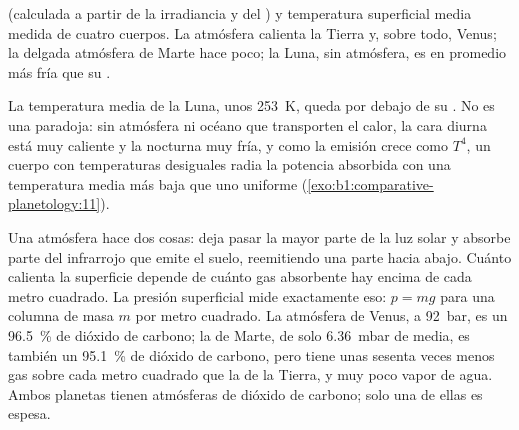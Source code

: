 \begin{omfigure}

{\small {} (calculada a partir de la irradiancia y del )
y temperatura superficial media medida de cuatro cuerpos. La atmósfera calienta la Tierra y,
sobre todo, Venus; la delgada atmósfera de Marte hace poco; la Luna, sin atmósfera, es en
promedio más fría que su .}
\end{omfigure}

La temperatura media de la Luna, unos \qty{253}{K}, queda por debajo de su . No es una paradoja: sin atmósfera ni océano que transporten el calor, la cara
diurna está muy caliente y la nocturna muy fría, y como la emisión crece como $T^4$, un cuerpo
con temperaturas desiguales radia la potencia absorbida con una temperatura media más baja que
uno uniforme (\cref{exo:b1:comparative-planetology:11}).

Una atmósfera hace dos cosas: deja pasar la mayor parte de la luz solar y absorbe parte del
infrarrojo que emite el suelo, reemitiendo una parte hacia abajo. Cuánto calienta la superficie
depende de cuánto gas absorbente hay encima de cada metro cuadrado. La presión superficial mide
exactamente eso: $p = mg$ para una columna de masa $m$ por metro cuadrado. La atmósfera de Venus,
a \qty{92}{bar}, es un \qty{96.5}{\percent} de dióxido de carbono; la de Marte, de solo
\qty{6.36}{mbar} de media, es también un \qty{95.1}{\percent} de dióxido de carbono, pero tiene
unas sesenta veces menos gas sobre cada metro cuadrado que la de la Tierra, y muy poco vapor de
agua. Ambos planetas tienen atmósferas de dióxido de carbono; solo una de ellas es espesa.

